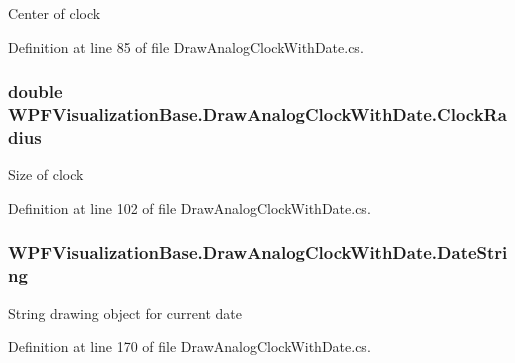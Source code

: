 Center of clock 



Definition at line 85 of file Draw\+Analog\+Clock\+With\+Date.\+cs.

\subsubsection[{\texorpdfstring{Clock\+Radius}{ClockRadius}}]{\setlength{\rightskip}{0pt plus 5cm}double W\+P\+F\+Visualization\+Base.\+Draw\+Analog\+Clock\+With\+Date.\+Clock\+Radius\hspace{0.3cm}{\ttfamily [get]}}\hypertarget{class_w_p_f_visualization_base_1_1_draw_analog_clock_with_date_a5103246fd066cf02a8076140e1546def}{}\label{class_w_p_f_visualization_base_1_1_draw_analog_clock_with_date_a5103246fd066cf02a8076140e1546def}


Size of clock 



Definition at line 102 of file Draw\+Analog\+Clock\+With\+Date.\+cs.

\subsubsection[{\texorpdfstring{Date\+String}{DateString}}]{ W\+P\+F\+Visualization\+Base.\+Draw\+Analog\+Clock\+With\+Date.\+Date\+String\hspace{0.3cm}{\ttfamily [get]}}\hypertarget{class_w_p_f_visualization_base_1_1_draw_analog_clock_with_date_a38dd55ea65aa6cccf5ad500ca96a48de}{}\label{class_w_p_f_visualization_base_1_1_draw_analog_clock_with_date_a38dd55ea65aa6cccf5ad500ca96a48de}


String drawing object for current date 



Definition at line 170 of file Draw\+Analog\+Clock\+With\+Date.\+cs.

